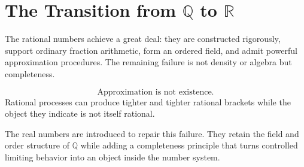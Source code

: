 
\section{The Transition from $\mathbb{Q}$ to $\mathbb{R}$}
\label{sec:transition-from-q-to-r}

The rational numbers achieve a great deal: they are constructed rigorously, support ordinary fraction arithmetic, form an ordered field, and admit powerful approximation procedures.  The remaining failure is not density or algebra but completeness.

\begin{remark*}
\[
\text{Approximation is not existence.}
\]
Rational processes can produce tighter and tighter rational brackets while the object they indicate is not itself rational.
\end{remark*}

\begin{remark*}[Transition]
The real numbers are introduced to repair this failure.  They retain the field and order structure of $\mathbb{Q}$ while adding a completeness principle that turns controlled limiting behavior into an object inside the number system.
\end{remark*}
